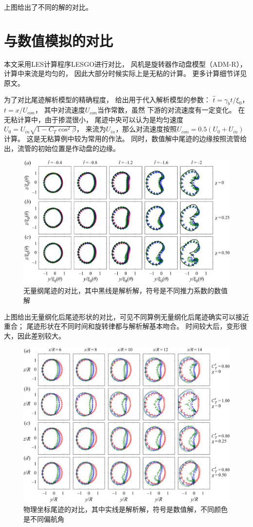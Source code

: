 \documentclass[UTF8,zihao=5]{ctexart} %
\begin{document}
上图给出了不同的解的对比。

\section{与数值模拟的对比}

本文采用LES计算程序LESGO进行对比，
风机是旋转器作动盘模型（ADM-R），
计算中来流是均匀的，
因此大部分时候实际上是无粘的计算。
更多计算细节详见原文。

为了对比尾迹解析模型的精确程度，
给出用于代入解析模型的参数：
$\hat {t}=\gamma _bt/\xi _0$，$t=x/U_{con}$，
其中对流速度$U_{con}$当作常数，虽然
下游的对流速度有一定变化。
在无粘计算中，由于掺混很小，
尾迹中央可以认为是均匀速度$U_0 = U_{{in}}\sqrt {1-C_T\cos ^{2}\beta }$，
来流为$U_{in}$，那么对流速度按照$U_{con} = 0.5(U_0 + U_{in})$计算。
这是无粘算例中较为常用的作法。
同时，数值解中尾迹的边缘按照流管给出，流管的初始位置是作动盘的边缘。

\begin{figure}[H]
    \centering
    \includegraphics[width=12cm]{Fig5.png}  %
    \caption{无量纲尾迹的对比，其中黑线是解析解，符号是不同推力系数的数值解}
\end{figure}

上图给出无量纲化后尾迹形状的对比，可见不同算例无量纲化后尾迹确实可以接近重合；
尾迹形状在不同时间和旋转律都与解析解基本吻合。
时间较大后，变形很大，因此差别较大。

\begin{figure}[H]
    \centering
    \includegraphics[width=12cm]{Fig6.png}  %
    \caption{物理坐标尾迹的对比，其中实线是解析解，符号是数值解，不同颜色是不同偏航角}
\end{figure}
\end{document}

